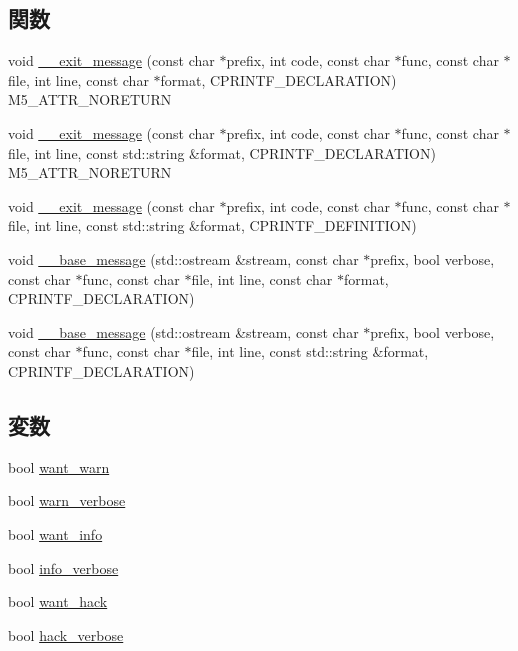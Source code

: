 \subsection*{関数}
\begin{DoxyCompactItemize}
\item 
void \hyperlink{base_2misc_8hh_a68e6d3e89c7b311b8f828b7e73eda1a8}{\_\-\_\-exit\_\-message} (const char $\ast$prefix, int code, const char $\ast$func, const char $\ast$file, int line, const char $\ast$format, CPRINTF\_\-DECLARATION) M5\_\-ATTR\_\-NORETURN
\item 
void \hyperlink{base_2misc_8hh_ac0c54a494dc5058898ba1605983ed96a}{\_\-\_\-exit\_\-message} (const char $\ast$prefix, int code, const char $\ast$func, const char $\ast$file, int line, const std::string \&format, CPRINTF\_\-DECLARATION) M5\_\-ATTR\_\-NORETURN
\item 
void \hyperlink{base_2misc_8hh_a2980c139d3566780f6d0decc610d66d2}{\_\-\_\-exit\_\-message} (const char $\ast$prefix, int code, const char $\ast$func, const char $\ast$file, int line, const std::string \&format, CPRINTF\_\-DEFINITION)
\item 
void \hyperlink{base_2misc_8hh_ae57acd68abdcfd027c698dceeed6c3c1}{\_\-\_\-base\_\-message} (std::ostream \&stream, const char $\ast$prefix, bool verbose, const char $\ast$func, const char $\ast$file, int line, const char $\ast$format, CPRINTF\_\-DECLARATION)
\item 
void \hyperlink{base_2misc_8hh_a96eba51390695b43adbae0ca47225ce8}{\_\-\_\-base\_\-message} (std::ostream \&stream, const char $\ast$prefix, bool verbose, const char $\ast$func, const char $\ast$file, int line, const std::string \&format, CPRINTF\_\-DECLARATION)
\end{DoxyCompactItemize}
\subsection*{変数}
\begin{DoxyCompactItemize}
\item 
bool \hyperlink{base_2misc_8hh_a77f6725c0d2349664643937fe56cafc0}{want\_\-warn}
\item 
bool \hyperlink{base_2misc_8hh_a6f7c2d176c7f3c537e9df30c83001331}{warn\_\-verbose}
\item 
bool \hyperlink{base_2misc_8hh_a3e07912efc18048822c757ea8a863933}{want\_\-info}
\item 
bool \hyperlink{base_2misc_8hh_a48b5c3c232bf262ed496dd11b6a1a5bc}{info\_\-verbose}
\item 
bool \hyperlink{base_2misc_8hh_a09cfe40e5e0aa49eac5976147c13d7ee}{want\_\-hack}
\item 
bool \hyperlink{base_2misc_8hh_a32fbfb9e755cc9af4492f027968de5a0}{hack\_\-verbose}
\end{DoxyCompactItemize}


